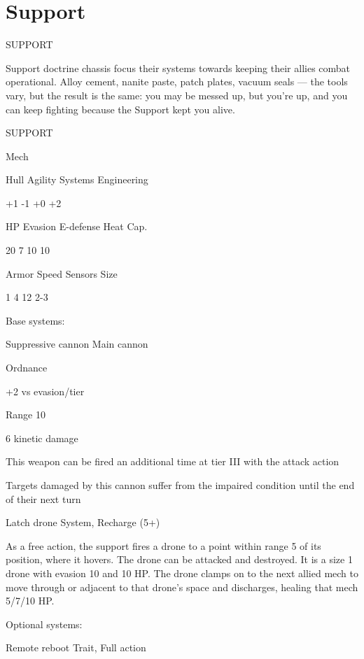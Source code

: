 \section{Support}

                                               SUPPORT  

Support doctrine chassis focus their systems towards keeping their allies combat operational.  
Alloy cement, nanite paste, patch plates, vacuum seals — the tools vary, but the result is the  
same: you may be messed up, but you’re up, and you can keep fighting because the Support  
kept you alive. 
 

 SUPPORT 

 Mech 

 Hull       Agility      Systems       Engineering 

 +1         -1           +0            +2 

 HP         Evasion      E-defense     Heat Cap. 

 20         7            10            10 

 Armor      Speed        Sensors       Size 

 1          4            12            2-3 

Base systems:  

Suppressive cannon  
Main cannon
 
Ordnance
 
+2 vs evasion/tier
 
Range 10
 
6 kinetic damage
 
This weapon can be fired an additional time at tier III with the attack action
 
Targets damaged by this cannon suffer from the impaired condition until the end of their next  
turn
 

Latch drone  
System, Recharge (5+)
 
As a free action, the support fires a drone to a point within range 5 of its position, where it  
hovers. The drone can be attacked and destroyed. It is a size 1 drone with evasion 10 and 10 HP.  
The drone clamps on to the next allied mech to move through or adjacent to that drone’s space  
and discharges, healing that mech 5/7/10 HP.
 

Optional systems:
 
Remote reboot  
Trait, Full action
 

                                                                                                          


